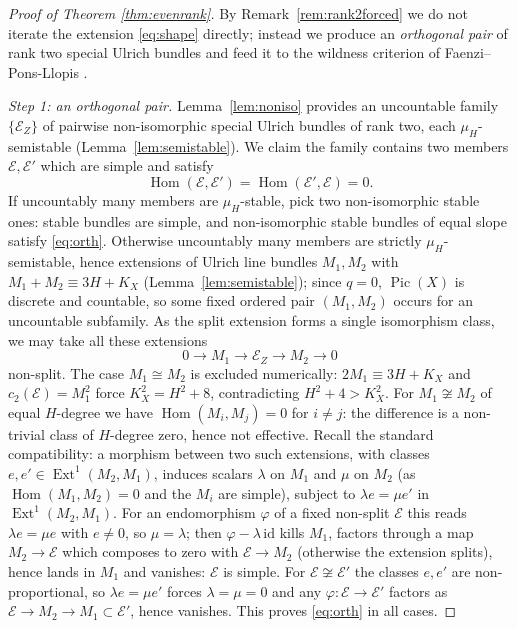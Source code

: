 \documentclass[10pt,a4paper]{amsart}
\newcommand{\EE}{\mathcal{E}}
\newcommand{\Pic}{\operatorname{Pic}}
\newcommand{\Ext}{\operatorname{Ext}}
\newcommand{\Hom}{\operatorname{Hom}}
\begin{document}
\begin{proof}[Proof of Theorem \textup{\ref{thm:evenrank}}]
By Remark~\ref{rem:rank2forced} we do not iterate the extension \eqref{eq:shape} directly; instead we produce an \emph{orthogonal pair} of rank two special Ulrich bundles and feed it to the wildness criterion of Faenzi--Pons-Llopis \cite{FPL}.

\smallskip
\noindent \emph{Step 1: an orthogonal pair.} Lemma~\ref{lem:noniso} provides an uncountable family $\{\EE_Z\}$ of pairwise non-isomorphic special Ulrich bundles of rank two, each $\mu_H$-semistable (Lemma~\ref{lem:semistable}). We claim the family contains two members $\EE,\EE'$ which are simple and satisfy
\begin{equation}\label{eq:orth}
\Hom(\EE,\EE')=\Hom(\EE',\EE)=0 .
\end{equation}
If uncountably many members are $\mu_H$-stable, pick two non-isomorphic stable ones: stable bundles are simple, and non-isomorphic stable bundles of equal slope satisfy \eqref{eq:orth}. Otherwise uncountably many members are strictly $\mu_H$-semistable, hence extensions of Ulrich line bundles $M_1,M_2$ with $M_1+M_2\equiv3H+K_X$ (Lemma~\ref{lem:semistable}); since $q=0$, $\Pic(X)$ is discrete and countable, so some fixed ordered pair $(M_1,M_2)$ occurs for an uncountable subfamily. As the split extension forms a single isomorphism class, we may take all these extensions
\[
0\to M_1\to\EE_Z\to M_2\to0
\]
non-split. The case $M_1\cong M_2$ is excluded numerically: $2M_1\equiv3H+K_X$ and $c_2(\EE)=M_1^2$ force $K_X^2=H^2+8$, contradicting $H^2+4>K_X^2$. For $M_1\not\cong M_2$ of equal $H$-degree we have $\Hom(M_i,M_j)=0$ for $i\neq j$: the difference is a non-trivial class of $H$-degree zero, hence not effective. Recall the standard compatibility: a morphism between two such extensions, with classes $e,e'\in\Ext^1(M_2,M_1)$, induces scalars $\lambda$ on $M_1$ and $\mu$ on $M_2$ (as $\Hom(M_1,M_2)=0$ and the $M_i$ are simple), subject to $\lambda e=\mu e'$ in $\Ext^1(M_2,M_1)$. For an endomorphism $\varphi$ of a fixed non-split $\EE$ this reads $\lambda e=\mu e$ with $e\neq0$, so $\mu=\lambda$; then $\varphi-\lambda\,\mathrm{id}$ kills $M_1$, factors through a map $M_2\to\EE$ which composes to zero with $\EE\to M_2$ (otherwise the extension splits), hence lands in $M_1$ and vanishes: $\EE$ is simple. For $\EE\not\cong\EE'$ the classes $e,e'$ are non-proportional, so $\lambda e=\mu e'$ forces $\lambda=\mu=0$ and any $\varphi:\EE\to\EE'$ factors as $\EE\to M_2\to M_1\subset\EE'$, hence vanishes. This proves \eqref{eq:orth} in all cases.


\end{proof}
\end{document}
